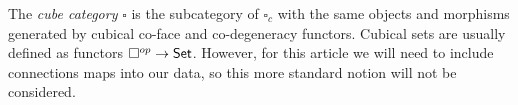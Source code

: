 \begin{remark} The \textit{cube category} $\square$ is the subcategory of $\square_c$ with the same objects and morphisms generated by cubical co-face and co-degeneracy functors. Cubical sets are usually defined as functors $\square^{op} \to \mathsf{Set}$. However, for this article we will need to include connections maps into our data, so this more standard notion will not be considered. 
\end{remark}







